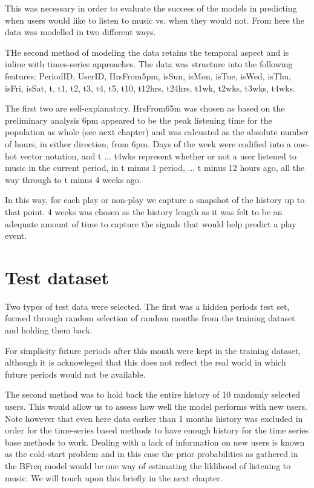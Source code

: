 This was necessary in order to evaluate the success of the models in predicting when users would like to listen to music vs. when they would not. From here the data was modelled in two different ways. 

THe second method of modeling the data retains the temporal aspect and is inline with times-series approaches. The data was structure into the following features: PeriodID, UserID, HrsFrom5pm, isSun, isMon, isTue, isWed, isThu, isFri, isSat, t, t1, t2, t3, t4, t5, t10, t12hrs, t24hrs, t1wk, t2wks, t3wks, t4wks.

The first two are self-explanatory. HrsFrom65m was chosen as based on the preliminary analysis 6pm appeared to be the peak listening time for the population as whole (see next chapter) and was calcuated as the absolute number of hours, in either direction, from 6pm. Days of the week were codified into a one-hot vector notation, and t ... t4wks represent whether or not a user listened to music in the current period, in t minus 1 period, ... t minus 12 hours ago, all the way through to t minus 4 weeks ago.

In this way, for each play or non-play we capture a snapshot of the history up to that point. 4 weeks was chosen as the history length as it was felt to be an adequate amount of time to capture the signals that would help predict a play event.

\section{Test dataset}
 
Two types of test data were selected. The first was a hidden periods test set, formed through random selection of random months from the training dataset and holding them back. 

For simplicity future periods after this month were kept in the training dataset, although it is acknowleged that this does not reflect the real world in which future periods would not be available.

The second method was to hold back the entire history of 10 randomly selected users. This would allow us to assess how well the model performs with new users. Note however that even here data earlier than 1 months history was excluded in order for the time-series based methods to have enough history for the time series base methods to work. Dealing with a lack of information on new users is known as the cold-start problem and in this case the prior probabilities as gathered in the BFreq model would be one way of estimating the liklihood of listening to music. We will touch upon this briefly in the next chapter.

